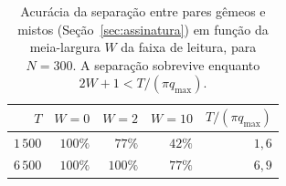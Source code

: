 \begin{table}[htbp]
\centering
\small
\begin{tabular}{rrrrr}
\toprule
$T$ & $W=0$ & $W=2$ & $W=10$ & $T/(\pi q_{\max})$ \\
\midrule
$1\,500$ & $100\%$ & $77\%$ & $42\%$ & $1{,}6$ \\
$6\,500$ & $100\%$ & $100\%$ & $77\%$ & $6{,}9$ \\
\bottomrule
\end{tabular}
\caption{Acurácia da separação entre pares gêmeos e mistos
(Seção~\ref{sec:assinatura}) em função da meia-largura $W$ da faixa de leitura,
para $N=300$. A separação sobrevive enquanto $2W+1<T/(\pi q_{\max})$.}
\label{tab:janela}
\end{table}
